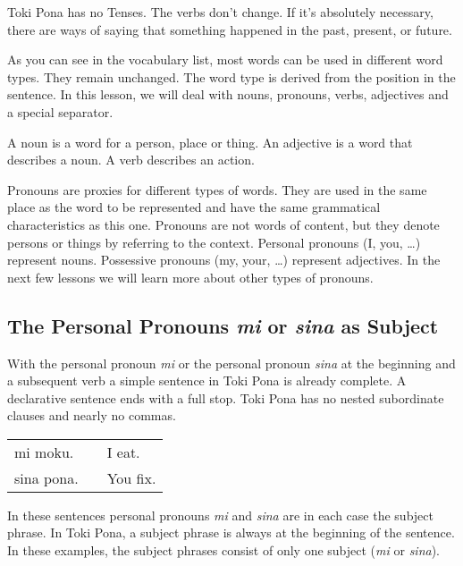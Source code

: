 Toki Pona has no Tenses.
The verbs don't change.
If it's absolutely necessary, there are ways of saying that something happened in the past, present, or future.

As you can see in the vocabulary list, most words can be used in different word types.
They remain unchanged.
The word type is derived from the position in the sentence.
In this lesson, we will deal with nouns, pronouns, verbs, adjectives and a special separator.

A noun is a word for a person, place or thing.
An adjective is a word that describes a noun.
A verb describes an action.

Pronouns are proxies for different types of words.
They are used in the same place as the word to be represented and have the same grammatical characteristics as this one.
Pronouns are not words of content, but they denote persons or things by referring to the context.
Personal pronouns (I, you, \dots) represent nouns.
Possessive pronouns (my, your, \dots) represent adjectives.
In the next few lessons we will learn more about other types of pronouns.

\subsection*{The Personal Pronouns \textit{mi} or \textit{sina} as Subject}
With the personal pronoun \textit{mi} or the personal pronoun \textit{sina} at the beginning and a subsequent verb a simple sentence in Toki Pona is already complete.
A declarative sentence ends with a full stop.
Toki Pona has no nested subordinate clauses and nearly no commas.

\begin{supertabular}{p{5,5cm}|ll}
    mi moku.   &  & I eat.   \\
    sina pona. &  & You fix. \\
\end{supertabular}

In these sentences personal pronouns \textit{mi} and \textit{sina} are in each case the subject phrase.
In Toki Pona, a subject phrase is always at the beginning of the sentence.
In these examples, the subject phrases consist of only one subject (\textit{mi} or \textit{sina}).

